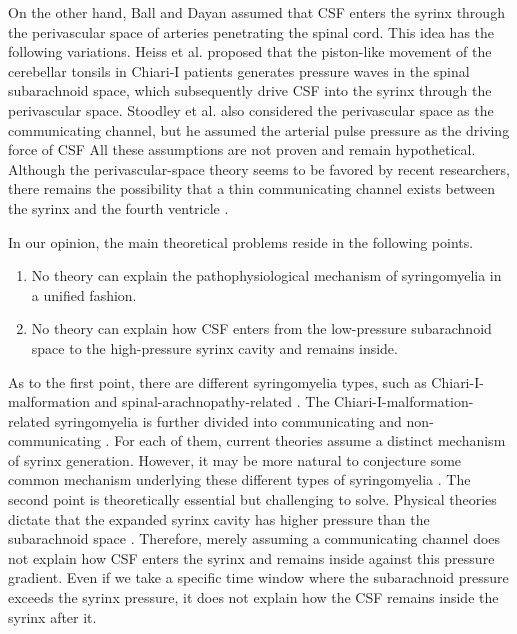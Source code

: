 \documentclass[fleqn,10pt]{wlscirep}
\begin{document}
On the other hand, Ball and Dayan \cite{ball1972pathogenesis} assumed that
CSF enters the syrinx through the perivascular space of arteries
penetrating the spinal cord. This idea has the following variations. Heiss
et al.  \cite{heiss1999elucidating} proposed that the piston-like movement
of the cerebellar tonsils in Chiari-I patients generates pressure waves in
the spinal subarachnoid space, which subsequently drive CSF into the syrinx
through the perivascular space. Stoodley et al. also considered the
perivascular space as the communicating channel, but he assumed the
arterial pulse pressure as the driving force of CSF
\cite{stoodley2000mechanisms} All these assumptions are not proven and
remain hypothetical. Although the perivascular-space theory seems to be
favored by recent researchers, there remains the possibility that a thin
communicating channel exists between the syrinx and the fourth ventricle
\cite{chang2021hypothesis}. 

In our opinion, the main theoretical problems reside in the following
points.
\begin{enumerate}
    \item No theory can explain the pathophysiological mechanism of
syringomyelia in a unified fashion.
    \item No theory can explain how CSF enters from the low-pressure subarachnoid space to the high-pressure syrinx cavity and remains inside.
\end{enumerate}

As to the first point, there are different syringomyelia types, such as
Chiari-I-malformation and spinal-arachnopathy-related
\cite{klekamp1997treatment}. The Chiari-I-malformation-related
syringomyelia is further divided into communicating and non-communicating
\cite{elliott2013syringomyelia}. For each of them, current theories assume
a distinct mechanism of syrinx generation. However, it may be more natural
to conjecture some common mechanism underlying these different types of
syringomyelia \cite{stoodley2000mechanisms}.  The second point is
theoretically essential but challenging to solve. Physical theories dictate
that the expanded syrinx cavity has higher pressure than the subarachnoid
space \cite{serwayr.a.2016fluids, heiss1999elucidating,
davis1989mechanisms, ellertsson1970distending}. Therefore, merely assuming
a communicating channel does not explain how CSF enters the syrinx and
remains inside against this pressure gradient. Even if we take a specific
time window where the subarachnoid pressure exceeds the syrinx pressure, it
does not explain how the CSF remains inside the syrinx after it.
\end{document}
